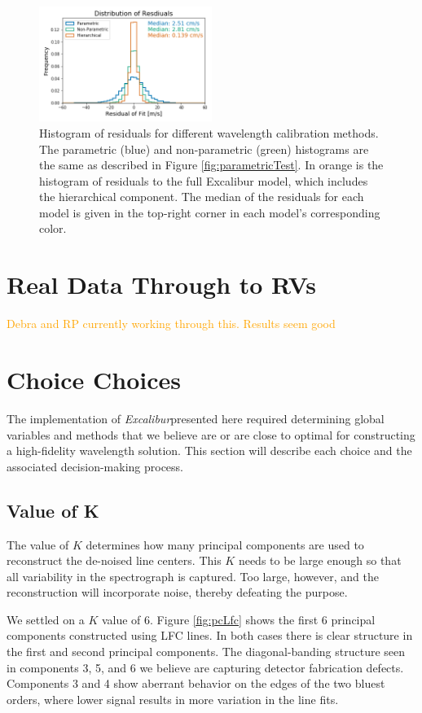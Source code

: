 \documentclass[12pt, letterpaper]{article}
\newcommand{\lz}[1]{\textcolor{orange}{#1}}
\newcommand{\project}[1]{\textsl{#1}}
\newcommand{\name}{\project{Excalibur}}
\begin{document}
\begin{figure}[h]
\centering
\includegraphics[width=0.5\textwidth]{Figures/allHists.png}
\caption{Histogram of residuals for different wavelength calibration methods.  The parametric (blue) and non-parametric (green) histograms are the same as described in Figure \ref{fig:parametricTest}.  In orange is the histogram of residuals to the full Excalibur model, which includes the hierarchical component.  The median of the residuals for each model is given in the top-right corner in each model's corresponding color.}
\label{fig:allHists}
\end{figure} 

\section{Real Data Through to RVs} \label{sec:realdata}
\lz{Debra and RP currently working through this.  Results seem good}

\section{Choice Choices} \label{sec:choices}
The implementation of  \name presented here required determining global variables and methods that we believe are or are close to optimal for constructing a high-fidelity wavelength solution.  This section will describe each choice and the associated decision-making process.

\subsection{Value of K}
The value of $K$ determines how many principal components are used to reconstruct the de-noised line centers.  This $K$ needs to be large enough so that all variability in the spectrograph is captured.  Too large, however, and the reconstruction will incorporate noise, thereby defeating the purpose.

We settled on a $K$ value of 6.  Figure \ref{fig:pcLfc} shows the first 6 principal components constructed using LFC lines.  In both cases there is clear structure in the first and second principal components.  The diagonal-banding structure seen in components 3, 5, and 6 we believe are capturing detector fabrication defects.  Components 3 and 4 show aberrant behavior on the edges of the two bluest orders, where lower signal results in more variation in the line fits.
\end{document}
